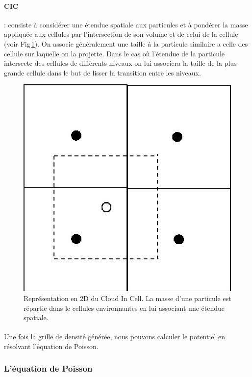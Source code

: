 \paragraph{CIC} : consiste à considérer une étendue spatiale aux particules et à pondérer la masse appliquée aux cellules par l'intersection de son volume et de celui de la cellule (voir Fig\,\ref{fig:CIC}).
On associe généralement une taille à la particule similaire a celle des cellule sur laquelle on la projette.
Dans le cas où l’étendue de la particule intersecte des cellules de différents niveaux on lui associera la taille de la plus grande cellule dans le but de lisser la transition entre les niveaux.

\begin{figure}[bth]
		\centering
        \includegraphics[width=.5\linewidth]{img/02/CIC.jpg} 
        \caption[CIC]{Représentation en 2D du Cloud In Cell. 
        La masse d'une particule est répartie dans le cellules environnantes en lui associant une étendue spatiale.
}
 		\label{fig:CIC}
\end{figure}

\paragraph{}
Une fois la grille de densité générée, nous pouvons calculer le potentiel en résolvant l'équation de Poisson.

\subsubsection{L'équation de Poisson}

